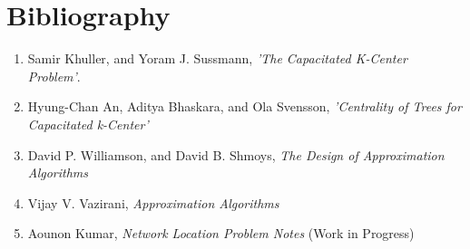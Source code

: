 \documentclass[12pt,a4paper,onecolumn]{article}
\begin{document}
\section{Bibliography}
\begin{enumerate}
\item Samir Khuller, and Yoram J. Sussmann, \textit{'The Capacitated K-Center Problem'}. 

\item Hyung-Chan An, Aditya Bhaskara, and Ola Svensson, \textit{'Centrality of Trees for Capacitated k-Center'}

\item David P. Williamson, and David B. Shmoys, 
\textit{The Design of Approximation Algorithms}
 
\item Vijay V. Vazirani, \textit{Approximation Algorithms}

\item Aounon Kumar, \textit{Network Location Problem Notes} (Work in Progress)
\end{enumerate}
\end{document}
